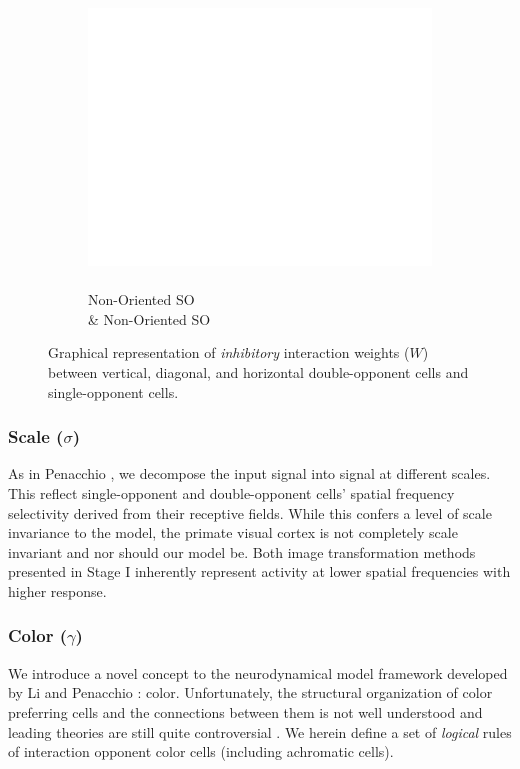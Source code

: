 \documentclass[journal,onecolumn]{IEEEtran}
\begin{document}
\begin{figure}[h]
\begin{subfigure}[b]{0.2\textwidth}
            \captionsetup{justification=centering}
            \includegraphics[width=.85\linewidth]{w_blank}
            \caption{\\ Non-Oriented SO \\ \& Non-Oriented SO}
    \end{subfigure}%
    \caption{Graphical representation of \textit{inhibitory} interaction weights ($W$) between vertical, diagonal, and horizontal double-opponent cells and single-opponent cells.}
\end{figure}

\subsubsection*{Scale ($\sigma$)}
As in Penacchio \cite{penacchio:2013}, we decompose the input signal into signal at different scales. This reflect single-opponent and double-opponent cells' spatial frequency selectivity derived from their receptive fields. While this confers a level of scale invariance to the model, the primate visual cortex is not completely scale invariant and nor should our model be. Both image transformation methods presented in Stage I inherently represent activity at lower spatial frequencies with higher response.

\subsubsection*{Color ($\gamma$)}
We introduce a novel concept to the neurodynamical model framework developed by Li \cite{li:1999} and Penacchio \cite{penacchio:2013}: color. Unfortunately, the structural organization of color preferring cells and the connections between them is not well understood and leading theories are still quite controversial \cite{shapley:2011}. We herein define a set of \textit{logical} rules of interaction opponent color cells (including achromatic cells).
\end{document}
